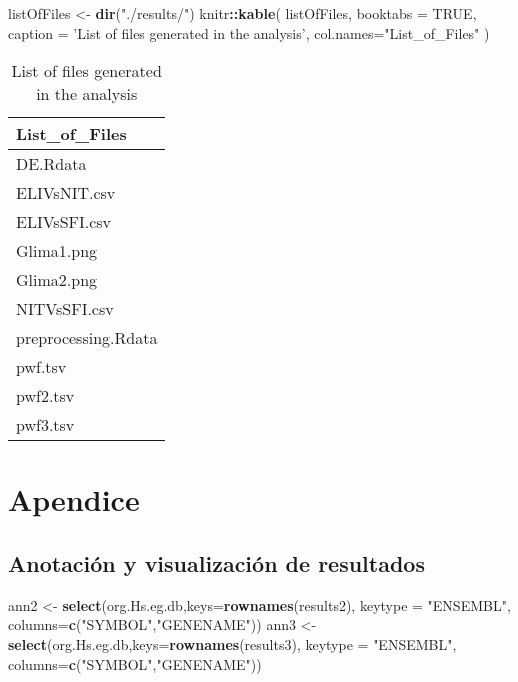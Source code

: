 \documentclass[
]{article}
\newenvironment{Shaded}{\begin{snugshade}}{\end{snugshade}}
\newcommand{\DataTypeTok}[1]{\textcolor[rgb]{0.13,0.29,0.53}{#1}}
\newcommand{\KeywordTok}[1]{\textcolor[rgb]{0.13,0.29,0.53}{\textbf{#1}}}
\newcommand{\NormalTok}[1]{#1}
\newcommand{\OperatorTok}[1]{\textcolor[rgb]{0.81,0.36,0.00}{\textbf{#1}}}
\newcommand{\OtherTok}[1]{\textcolor[rgb]{0.56,0.35,0.01}{#1}}
\newcommand{\StringTok}[1]{\textcolor[rgb]{0.31,0.60,0.02}{#1}}
\begin{document}
\begin{Shaded}
\begin{Highlighting}[]
\NormalTok{listOfFiles <-}\StringTok{ }\KeywordTok{dir}\NormalTok{(}\StringTok{"./results/"}\NormalTok{) }
\NormalTok{knitr}\OperatorTok{::}\KeywordTok{kable}\NormalTok{(}
\NormalTok{  listOfFiles, }\DataTypeTok{booktabs =} \OtherTok{TRUE}\NormalTok{,}
  \DataTypeTok{caption =} \StringTok{'List of files generated in the analysis'}\NormalTok{,}
  \DataTypeTok{col.names=}\StringTok{"List_of_Files"}
\NormalTok{)}
\end{Highlighting}
\end{Shaded}

\begin{table}

\caption{\label{tab:unnamed-chunk-58}List of files generated in the analysis}
\centering
\begin{tabular}[t]{l}
\toprule
List\_of\_Files\\
\midrule
DE.Rdata\\
ELIVsNIT.csv\\
ELIVsSFI.csv\\
Glima1.png\\
Glima2.png\\
\addlinespace
NITVsSFI.csv\\
preprocessing.Rdata\\
pwf.tsv\\
pwf2.tsv\\
pwf3.tsv\\
\bottomrule
\end{tabular}
\end{table}

\hypertarget{apendice}{%
\section{Apendice}\label{apendice}}

\hypertarget{anotaciuxf3n-y-visualizaciuxf3n-de-resultados-1}{%
\subsection{Anotación y visualización de
resultados}\label{anotaciuxf3n-y-visualizaciuxf3n-de-resultados-1}}

\begin{Shaded}
\begin{Highlighting}[]
\NormalTok{ann2 <-}\StringTok{ }\KeywordTok{select}\NormalTok{(org.Hs.eg.db,}\DataTypeTok{keys=}\KeywordTok{rownames}\NormalTok{(results2), }\DataTypeTok{keytype =} \StringTok{"ENSEMBL"}\NormalTok{,}
              \DataTypeTok{columns=}\KeywordTok{c}\NormalTok{(}\StringTok{"SYMBOL"}\NormalTok{,}\StringTok{"GENENAME"}\NormalTok{))}
\NormalTok{ann3 <-}\StringTok{ }\KeywordTok{select}\NormalTok{(org.Hs.eg.db,}\DataTypeTok{keys=}\KeywordTok{rownames}\NormalTok{(results3), }\DataTypeTok{keytype =} \StringTok{"ENSEMBL"}\NormalTok{,}
              \DataTypeTok{columns=}\KeywordTok{c}\NormalTok{(}\StringTok{"SYMBOL"}\NormalTok{,}\StringTok{"GENENAME"}\NormalTok{))}
\end{Highlighting}
\end{Shaded}
\end{document}
